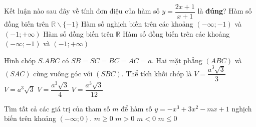 \begin{ex}%
Kết luận nào sau đây về tính đơn điệu của hàm số $y=\dfrac{2x+1}{x+1}$ là {\bf đúng}?
\choice
{Hàm số đồng biến trên $\mathbb R\backslash\{-1\}$}
{Hàm số nghịch biến trên các khoảng $(-\infty;-1)$ và $(-1;+\infty)$}
{Hàm số đồng biến trên $\mathbb R$}
{\True Hàm số đồng biến trên các khoảng $(-\infty;-1)$ và $(-1;+\infty)$}
\end{ex}

\begin{ex}%
Hình chóp $S.ABC$ có $SB=SC=BC=AC=a$. Hai mặt phẳng $(ABC)$ và $(SAC)$ cùng vuông góc với $(SBC)$. Thể tích khối chóp là
\choice
{$V=\dfrac{a^3\sqrt3}{3}$}
{$V=a^3\sqrt3$}
{$V=\dfrac{a^3\sqrt3}{4}$}
{\True $V=\dfrac{a^3\sqrt3}{12}$}
\end{ex}

\begin{ex}%
Tìm tất cả các giá trị của tham số $m$ để hàm số $y=-x^3+3x^2-mx+1$ nghịch biến trên khoảng $(-\infty;0)$.
\choice
{\True $m\ge0$}
{$m>0$}
{$m<0$}
{$m\le0$}
\end{ex}

